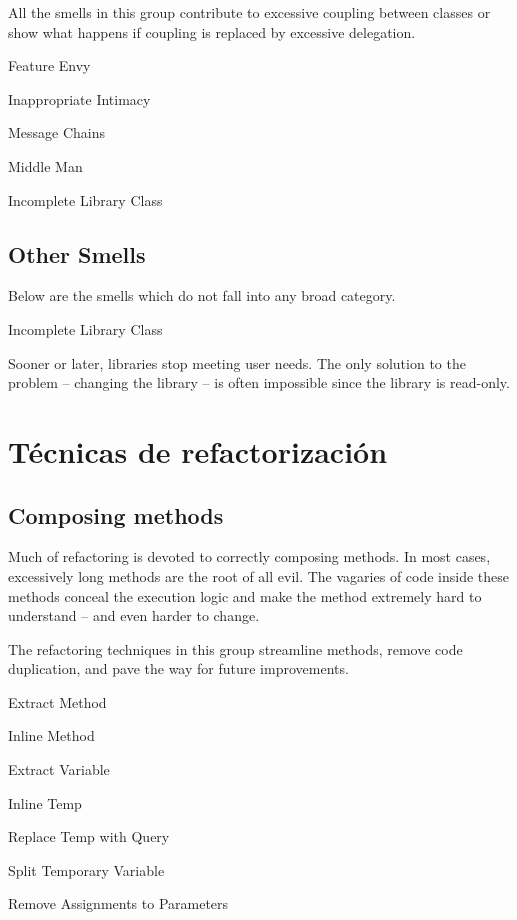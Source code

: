 \documentclass[11pt,a4paper,oneside]{book}
\begin{document}
All the smells in this group contribute to excessive coupling between classes or show what happens if coupling is replaced by excessive delegation.

    Feature Envy
    
    Inappropriate Intimacy
    
    Message Chains
    
    Middle Man

    Incomplete Library Class


\section{Other Smells}

Below are the smells which do not fall into any broad category.

Incomplete Library Class

Sooner or later, libraries stop meeting user needs. The only solution to the problem – changing the library – is often impossible since the library is read-only.



\chapter{Técnicas de refactorización}


\section{Composing methods}

Much of refactoring is devoted to correctly composing methods. In most cases, excessively long methods are the root of all evil. The vagaries of code inside these methods conceal the execution logic and make the method extremely hard to understand – and even harder to change.

The refactoring techniques in this group streamline methods, remove code duplication, and pave the way for future improvements.

    Extract Method
    
    
    Inline Method

    
    
    Extract Variable
    
    
    Inline Temp
    
    
    Replace Temp with Query
    
    Split Temporary Variable
    
    Remove Assignments to Parameters
    
\end{document}
